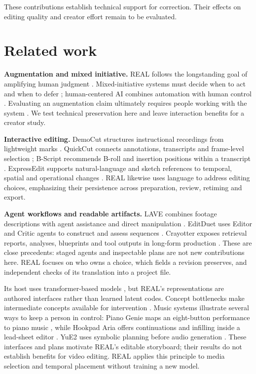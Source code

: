 \documentclass{ceurart}
\begin{document}
These contributions establish technical support for correction. Their
effects on editing quality and creator effort remain to be evaluated.

\section{Related work}\label{related-work}

\textbf{Augmentation and mixed initiative.} REAL follows the
longstanding goal of amplifying human judgment
\citep{engelbart1962augmenting}. Mixed-initiative systems must decide
when to act and when to defer \citep{horvitz1999mixed}; human-centered
AI combines automation with human control \citep{shneiderman2020human}.
Evaluating an augmentation claim ultimately requires people working with
the system \citep{haupt2025centaur}. We test technical preservation here
and leave interaction benefits for a creator study.

\textbf{Interactive editing.} DemoCut structures instructional
recordings from lightweight marks \citep{chi2013democut}. QuickCut
connects annotations, transcripts and frame-level selection
\citep{truong2016quickcut}; B-Script recommends B-roll and insertion
positions within a transcript \citep{huber2019bscript}. ExpressEdit
supports natural-language and sketch references to temporal, spatial and
operational changes \citep{tilekbay2024express}. REAL likewise uses
language to address editing choices, emphasizing their persistence
across preparation, review, retiming and export.

\textbf{Agent workflows and readable artifacts.} LAVE combines footage
descriptions with agent assistance and direct manipulation
\citep{wang2024lave}. EditDuet uses Editor and Critic agents to
construct and assess sequences \citep{sandoval2025editduet}. Crayotter
exposes retrieval reports, analyses, blueprints and tool outputs in
long-form production \citep{yan2026crayotter}. These are close
precedents: staged agents and inspectable plans are not new
contributions here. REAL focuses on who owns a choice, which fields a
revision preserves, and independent checks of its translation into a
project file.

Its host uses transformer-based models \citep{vaswani2017attention}, but
REAL's representations are authored interfaces rather than learned
latent codes. Concept bottlenecks make intermediate concepts available
for intervention \citep{koh2020concept}. Music systems illustrate
several ways to keep a person in control: Piano Genie maps an
eight-button performance to piano music \citep{donahue2019piano}, while
Hookpad Aria offers continuations and infilling inside a lead-sheet
editor \citep{donahue2024aria}. YuE2 uses symbolic planning before audio
generation \citep{yuan2026yue2}. These interfaces and plans motivate
REAL's editable storyboard; their results do not establish benefits for
video editing. REAL applies this principle to media selection and
temporal placement without training a new model.
\end{document}
